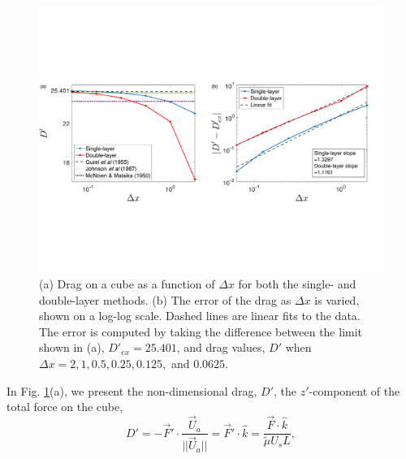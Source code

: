 \begin{figure}[ht]
	\begin{center}
		\includegraphics[scale=0.5]{figures/fig_compare_drag_error}
	\end{center}
	\caption{(a) Drag on a cube as a function of $\Delta x$ for both the single- and double-layer methods. (b) The error of the drag as $\Delta x$ is varied, shown on a log-log scale. Dashed lines are linear fits to the data. The error is computed by taking the difference between the limit shown in (a), $D'_{ex} = 25.401$, and drag values, $D'$ when $\Delta x = 2, 1, 0.5,   0.25,  0.125,$ and $0.0625$. }
	\label{fig_drag_compare}
\end{figure}
In  Fig. \ref{fig_drag_compare}(a), we present the non-dimensional drag, $D'$, the $z'$-component of the total force on the cube, 
\begin{equation}
D' = -\vec{F}' \cdot \frac{\vec{U}_a}{||\vec{U}_a||} =  \vec{F}' \cdot \hat{k} =  \frac{\vec{F} \cdot \hat{k}}{ \tilde{\mu} U_s L}, 
\label{eq_drag}
\end{equation}

